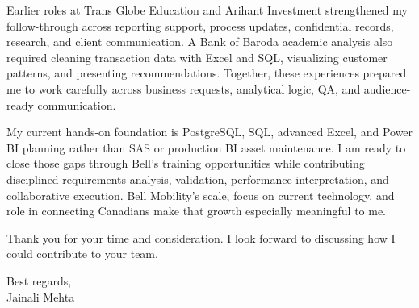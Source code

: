 \documentclass[letterpaper,11pt]{article}
\begin{document}
\bigbreak
Earlier roles at Trans Globe Education and Arihant Investment strengthened my follow-through across reporting support, process updates, confidential records, research, and client communication. A Bank of Baroda academic analysis also required cleaning transaction data with Excel and SQL, visualizing customer patterns, and presenting recommendations. Together, these experiences prepared me to work carefully across business requests, analytical logic, QA, and audience-ready communication.

\bigbreak
My current hands-on foundation is PostgreSQL, SQL, advanced Excel, and Power BI planning rather than SAS or production BI asset maintenance. I am ready to close those gaps through Bell's training opportunities while contributing disciplined requirements analysis, validation, performance interpretation, and collaborative execution. Bell Mobility's scale, focus on current technology, and role in connecting Canadians make that growth especially meaningful to me.

\bigbreak
Thank you for your time and consideration. I look forward to discussing how I could contribute to your team.

\bigbreak
Best regards,\\
Jainali Mehta
\end{document}
